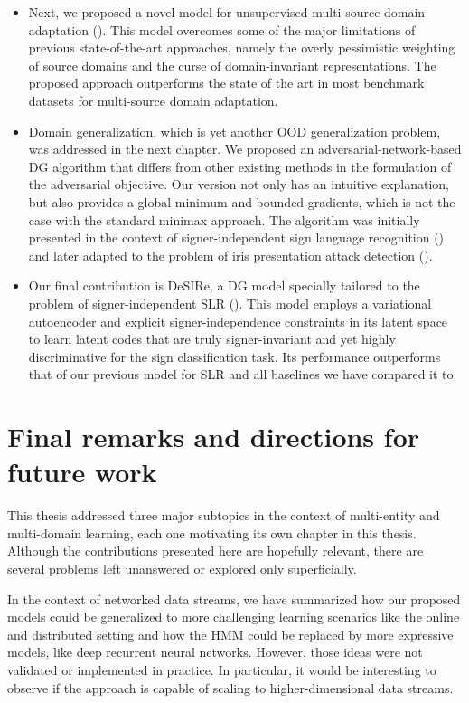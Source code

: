 \begin{itemize}
    \item Next, we proposed a novel model for unsupervised multi-source domain adaptation (). This model overcomes some of the major limitations of previous state-of-the-art approaches, namely the overly pessimistic weighting of source domains and the curse of domain-invariant representations. The proposed approach outperforms the state of the art in most benchmark datasets for multi-source domain adaptation.
    \item Domain generalization, which is yet another OOD generalization problem, was addressed in the next chapter. We proposed an adversarial-network-based DG algorithm that differs from other existing methods in the formulation of the adversarial objective. Our version not only has an intuitive explanation, but also provides a global minimum and bounded gradients, which is not the case with the standard minimax approach. The algorithm was initially presented in the context of signer-independent sign language recognition () and later adapted to the problem of iris presentation attack detection ().
    \item Our final contribution is DeSIRe, a DG model specially tailored to the problem of signer-independent SLR (). This model employs a variational autoencoder and explicit signer-independence constraints in its latent space to learn latent codes that are truly signer-invariant and yet highly discriminative for the sign classification task. Its performance outperforms that of our previous model for SLR and all baselines we have compared it to.
\end{itemize}

\section{Final remarks and directions for future work}
This thesis addressed three major subtopics in the context of multi-entity and multi-domain learning, each one motivating its own chapter in this thesis. Although the contributions presented here are hopefully relevant, there are several problems left unanswered or explored only superficially.

In the context of networked data streams, we have summarized how our proposed models could be generalized to more challenging learning scenarios like the online and distributed setting and how the HMM could be replaced by more expressive models, like deep recurrent neural networks. However, those ideas were not validated or implemented in practice. In particular, it would be interesting to observe if the approach is  capable of scaling to higher-dimensional data streams.

